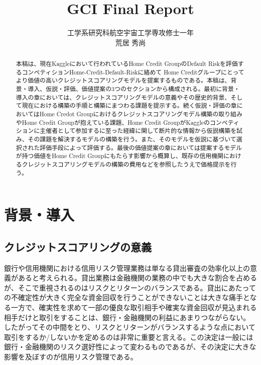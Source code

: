 \documentclass[11pt]{jsarticle}
\title{GCI Final Report}
\author{工学系研究科航空宇宙工学専攻修士一年\\荒居 秀尚}
\begin{document}
    
    
    \maketitle
    
    

    \begin{abstract}
本稿は、現在Kaggleにおいて行われているHome Credit GroupのDefault Riskを評価するコンペティションHome-Credit-Default-Riskに絡めて
Home Creditグループにとってより価値の高いクレジットスコアリングモデルを提案するものである。本稿は、背景・導入、仮説・評価、価値提案の3つのセクションから構成される。最初に背景・導入の章においては、クレジットスコアリングモデルの意義やその歴史的背景、そして現在における構築の手順と構築にまつわる課題を提示する。続く仮説・評価の章においてはHome Credot Groupにおけるクレジットスコアリングモデル構築の取り組みやHome Credit Groupが抱えている課題、Home Credit GroupがKaggleのコンペティションに主催者として参加するに至った経緯に関して断片的な情報から仮説構築を試み、その課題を解決するモデルの構築を行う。また、そのモデルを仮説に基づいて選択された評価手段によって評価する。最後の価値提案の章においては提案するモデルが持つ価値をHome Credit Groupにもたらす影響から概算し、既存の信用機関におけるクレジットスコアリングモデルの構築の費用などを参照したうえで価格提示を行う。
\end{abstract}
    \section{背景・導入}\label{ux80ccux666fux5c0eux5165}

\subsection{クレジットスコアリングの意義}\label{ux30afux30ecux30b8ux30c3ux30c8ux30b9ux30b3ux30a2ux30eaux30f3ux30b0ux306eux610fux7fa9}
銀行や信用機関における信用リスク管理業務は単なる貸出審査の効率化以上の意義があると考えられる。貸出業務は金融機関の業務の中でも大きな割合を占めるが、そこで重視されるのはリスクとリターンのバランスである。貸出にあたっての不確定性が大きく完全な資金回収を行うことができないことは大きな痛手となる一方で、確実性を求めて一部の優良な取引相手や確実な資金回収が見込まれる相手だけと取引をすることは、銀行・金融機関の利益にあまりつながらない。したがってその中間をとり、リスクとリターンがバランスするような点において取引をするか/しないかを定めるのは非常に重要と言える。この決定は一般には銀行・金融機関のリスク選好性によって変わるものであるが、その決定に大きな影響を及ぼすのが信用リスク管理である。\\
\end{document}
